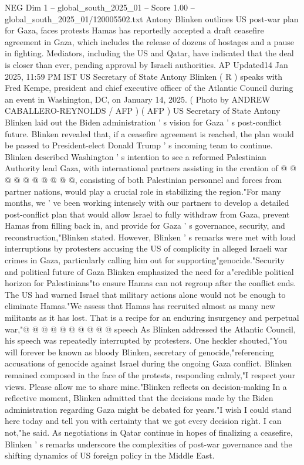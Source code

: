 \begin{textsample}{NEG Dim 1 – global\_south\_2025\_01 – Score 1.00 – global\_south\_2025\_01/120005502.txt}  \label{ex:f1_neg_154}
Antony Blinken outlines US post-war plan for Gaza, faces protests Hamas has reportedly accepted a draft ceasefire agreement in Gaza, which includes the release of dozens of hostages and a pause in fighting.
Mediators, including the US and Qatar, have indicated that the deal is closer than ever, pending approval by Israeli authorities.
AP Updated14 Jan 2025, 11:59 PM IST US Secretary of State Antony Blinken ( R ) speaks with Fred Kempe, president and chief executive officer of the Atlantic Council during an event in Washington, DC, on January 14, 2025. ( Photo by ANDREW CABALLERO-REYNOLDS / AFP ) ( AFP ) US Secretary of State Antony Blinken laid out the Biden administration ' s vision for Gaza ' s post-conflict future.
Blinken revealed that, if a ceasefire agreement is reached, the plan would be passed to President-elect Donald Trump ' s incoming team to continue.
Blinken described Washington ' s intention to see a reformed Palestinian Authority lead Gaza, with international partners assisting in the creation of @ @ @ @ @ @ @ @ @ @, consisting of both Palestinian personnel and forces from partner nations, would play a crucial role in stabilizing the region."For many months, we ' ve been working intensely with our partners to develop a detailed post-conflict plan that would allow Israel to fully withdraw from Gaza, prevent Hamas from filling back in, and provide for Gaza ' s governance, security, and reconstruction,"Blinken stated.
However, Blinken ' s remarks were met with loud interruptions by protesters accusing the US of complicity in alleged Israeli war crimes in Gaza, particularly calling him out for supporting"genocide."Security and political future of Gaza Blinken emphasized the need for a"credible political horizon for Palestinians"to ensure Hamas can not regroup after the conflict ends.
The US had warned Israel that military actions alone would not be enough to eliminate Hamas."We assess that Hamas has recruited almost as many new militants as it has lost.
That is a recipe for an enduring insurgency and perpetual war,"@ @ @ @ @ @ @ @ @ @ speech As Blinken addressed the Atlantic Council, his speech was repeatedly interrupted by protesters.
One heckler shouted,"You will forever be known as bloody Blinken, secretary of genocide,"referencing accusations of genocide against Israel during the ongoing Gaza conflict.
Blinken remained composed in the face of the protests, responding calmly,"I respect your views.
Please allow me to share mine."Blinken reflects on decision-making In a reflective moment, Blinken admitted that the decisions made by the Biden administration regarding Gaza might be debated for years."I wish I could stand here today and tell you with certainty that we got every decision right.
I can not,"he said.
As negotiations in Qatar continue in hopes of finalizing a ceasefire, Blinken ' s remarks underscore the complexities of post-war governance and the shifting dynamics of US foreign policy in the Middle East.

\end{textsample}
